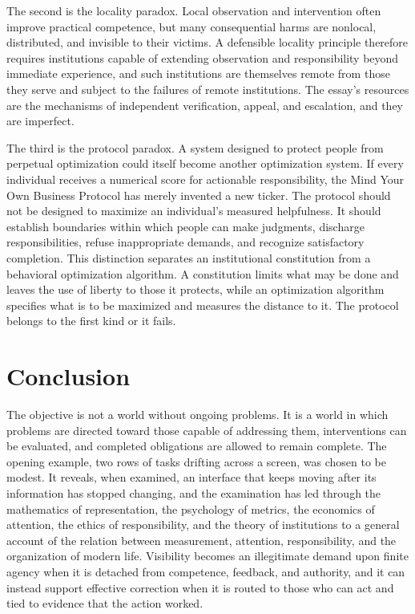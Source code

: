\documentclass[11pt]{report}
\theoremstyle{definition}
\theoremstyle{remark}
\begin{document}
The second is the locality paradox. Local observation and intervention often improve practical competence, but many consequential harms are nonlocal, distributed, and invisible to their victims. A defensible locality principle therefore requires institutions capable of extending observation and responsibility beyond immediate experience, and such institutions are themselves remote from those they serve and subject to the failures of remote institutions. The essay's resources are the mechanisms of independent verification, appeal, and escalation, and they are imperfect.

The third is the protocol paradox. A system designed to protect people from perpetual optimization could itself become another optimization system. If every individual receives a numerical score for actionable responsibility, the Mind Your Own Business Protocol has merely invented a new ticker. The protocol should not be designed to maximize an individual's measured helpfulness. It should establish boundaries within which people can make judgments, discharge responsibilities, refuse inappropriate demands, and recognize satisfactory completion. This distinction separates an institutional constitution from a behavioral optimization algorithm. A constitution limits what may be done and leaves the use of liberty to those it protects, while an optimization algorithm specifies what is to be maximized and measures the distance to it. The protocol belongs to the first kind or it fails.

\section{Conclusion}

The objective is not a world without ongoing problems. It is a world in which problems are directed toward those capable of addressing them, interventions can be evaluated, and completed obligations are allowed to remain complete. The opening example, two rows of tasks drifting across a screen, was chosen to be modest. It reveals, when examined, an interface that keeps moving after its information has stopped changing, and the examination has led through the mathematics of representation, the psychology of metrics, the economics of attention, the ethics of responsibility, and the theory of institutions to a general account of the relation between measurement, attention, responsibility, and the organization of modern life. Visibility becomes an illegitimate demand upon finite agency when it is detached from competence, feedback, and authority, and it can instead support effective correction when it is routed to those who can act and tied to evidence that the action worked.
\end{document}
